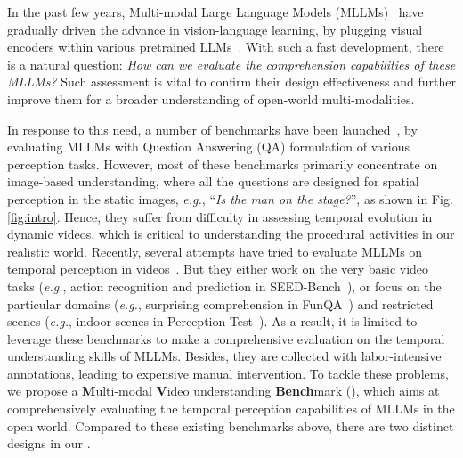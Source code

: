 In the past few years,
Multi-modal Large Language Models (MLLMs)~\cite{gpt4v,flamingo,blip2,palme,minigpt4,llava,kosmos,videochat} 
have gradually driven the advance in vision-language learning, 
by plugging visual encoders within various pretrained LLMs~\cite{devlin2018bert,palm,chatgpt,llama1,vicuna}. 
With such a fast development,
there is a natural question: 
\textit{How can we evaluate the comprehension capabilities of these MLLMs?}
Such assessment is vital to confirm their design effectiveness and further improve them for a broader understanding of open-world multi-modalities.

In response to this need,
a number of benchmarks have been launched~\cite{pope,lvlm_ehub,mme,mmbench,mmvet},
by evaluating MLLMs with Question Answering (QA) formulation of various perception tasks.
However,
most of these benchmarks primarily concentrate on image-based understanding,
where
all the questions are designed for spatial perception in the static images,
\textit{e.g.},
``\textit{Is the man on the stage?}'',
as shown in Fig. \ref{fig:intro}.
Hence,
they suffer from difficulty in assessing temporal evolution in dynamic videos,
which is critical to understanding the procedural activities in our realistic world.
Recently,
several attempts have tried to evaluate MLLMs on temporal perception in videos~\cite{seedbench,funqa,perception_test,videochatgpt}. 
But they either work on the very basic video tasks (\textit{e.g.}, action recognition and prediction in SEED-Bench~\cite{seedbench}), 
or focus on the particular domains (\textit{e.g.}, surprising comprehension in FunQA~\cite{funqa}) and restricted scenes (\textit{e.g.}, indoor scenes in Perception Test~\cite{perception_test}).
As a result,
it is limited to leverage these benchmarks to make a comprehensive evaluation on the temporal understanding skills of MLLMs.
Besides,
they are collected with labor-intensive annotations,
leading to expensive manual intervention.
To tackle these problems, 
we propose a \textbf{M}ulti-modal \textbf{V}ideo understanding \textbf{Bench}mark (\textbf{\BenchName}),
which aims at comprehensively evaluating the temporal perception capabilities of MLLMs in the open world.
Compared to these existing benchmarks above,
there are two distinct designs in our \BenchName.

